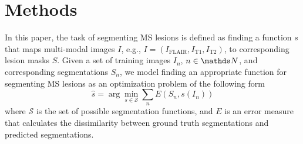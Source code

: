 \section{Methods}
\label{sec:method}

In this paper, the task of segmenting MS lesions is defined as finding a
function $s$ that maps multi-modal images $I$, e.g., $I = (I_\text{FLAIR},
I_\text{T1}, I_\text{T2})$, to corresponding lesion masks $S$. Given a set of
training images $I_n$, $n \in \N$, and corresponding segmentations $S_n$, we
model finding an appropriate function for segmenting MS lesions as an
optimization problem of the following form
\begin{equation}
\hat{s} = \arg \min_{s \in \mathcal{S}} \sum_n E(S_n, s(I_n))
\label{eq:segprob}
\end{equation}
where $\mathcal{S}$ is the set of possible segmentation functions, and $E$ is an
error measure that calculates the dissimilarity between ground truth
segmentations and predicted segmentations.


% 
% 
% 

